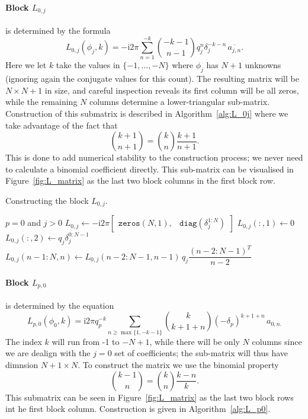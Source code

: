 \documentclass[12pt,a4paper,fleqn]{article}
\newcommand{\conj}[1]{\overline{#1}}
\renewcommand{\i}{\mathrm{i}}
\begin{document}
\paragraph{Block $L_{0,j}$} is determined by the formula
\begin{equation}
  L_{0,j}(\phi_j,k) = -\i2\pi \sum_{n=1}^{-k} \binom{-k-1}{n-1} q_j^n \delta_j^{-k-n} \,\conj{a_{j,n}}.
  \label{eq:block_L0j}
\end{equation}
Here we let $k$ take the values in $\{-1, \dots, -N\}$ where $\phi_j$ has $N+1$ unknowns (ignoring again the conjugate values for this count). The resulting matrix will be $N\times N + 1$ in size, and careful inspection reveals its first column will be all zeros, while the remaining $N$ columns determine a lower-triangular sub-matrix. Construction of this submatrix is described in Algorithm~\ref{alg:L_0j} where we take advantage of the fact that
\begin{equation}
  \binom{k+1}{n+1} = \binom{k}{n} \frac{k+1}{n+1}.
\end{equation}
This is done to add numerical stability to the construction process; we never need to calculate a binomial coefficient directly. This sub-matrix can be visualised in Figure~\ref{fig:L_matrix} as the last two block columns in the first block row.

\begin{algorithm}
  \caption{Constructing the block $L_{0,j}$.}
  \label{alg:L_0j}
  \begin{algorithmic}[1]
    \REQUIRE $p = 0$ and $j > 0$
      \STATE $L_{0,j} \leftarrow -\i2\pi \begin{bmatrix} \mathtt{zeros}(N, 1), & \mathtt{diag}(\delta_j^{1:N}) \end{bmatrix}$
    \ELSE[$\delta_j \ne 0$]
      \STATE $L_{0,j}(:,1) \leftarrow 0$
      \STATE $L_{0,j}(:,2) \leftarrow q_j \delta_j^{0:N-1}$
        \STATE $L_{0,j}(n-1:N, n) \leftarrow L_{0,j}(n-2:N-1,n-1) \,q_j \dfrac{(n-2:N-1)^T}{n-2}$
      \ENDFOR
    \ENDIF
  \end{algorithmic}
\end{algorithm}

\paragraph{Block $L_{p,0}$} is determined by the equation
\begin{equation}
  L_{p,0}(\phi_0,k) = \i2\pi q_p^{-k} \sum_{n\ge\max\{1,-k-1\}} \binom{k}{k+1+n} (-\delta_p)^{k+1+n} \,a_{0,n.}
  \label{eq:block_Lp0}
\end{equation}
The index $k$ will run from -1 to $-N+1$, while there will be only $N$ columns since we are dealign with the $j=0$ set of coefficients; the sub-matrix will thus have dimnsion $N+1\times N$. To construct the matrix we use the binomial property
\begin{equation}
  \binom{k-1}{n} = \binom{k}{n} \frac{k-n}{k}.
\end{equation}
This submatrix can be seen in Figure~\ref{fig:L_matrix} as the last two block rows int he first block column. Construction is given in Algorithm~\ref{alg:L_p0}.
\end{document}
